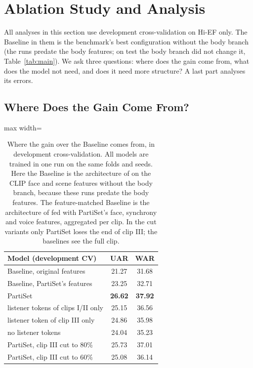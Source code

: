 \documentclass[11pt]{article}
\newcommand{\model}{PartiSet}
\begin{document}
\section{Ablation Study and Analysis}
\label{sec:ablation}

All analyses in this section use development cross-validation on Hi-EF only. The Baseline in them is the benchmark's
best configuration without the body branch (the runs predate the body features; on test the body branch did not change
it, Table~\ref{tab:main}). We ask three questions: where does the gain come from,
what does the model not need, and does it need more structure? A last part analyses its errors.

\subsection{Where Does the Gain Come From?}
\label{sec:origin}

\begin{table}[t]
\centering\small
\begin{adjustbox}{max width=\columnwidth}
\begin{tabular}{lcc}
\toprule
Model (development CV) & UAR & WAR \\
\midrule
Baseline, original features & 21.27 & 31.68 \\
Baseline, \model{}'s features & 23.25 & 32.71 \\
\midrule
\model{} & \textbf{26.62} & \textbf{37.92} \\
\quad listener tokens of clips I/II only & 25.15 & 36.56 \\
\quad listener token of clip III only & 24.86 & 35.98 \\
\quad no listener tokens & 24.04 & 35.23 \\
\midrule
\model{}, clip III cut to 80\% & 25.73 & 37.01 \\
\model{}, clip III cut to 60\% & 25.08 & 36.14 \\
\bottomrule
\end{tabular}
\end{adjustbox}
\caption{Where the gain over the Baseline comes from, in development cross-validation. All models are trained in one run
on the same folds and seeds. Here the Baseline is the architecture of \citet{wang2026hief} on the CLIP face and scene
features without the body branch, because these runs predate the body features. The feature-matched Baseline is the architecture of \citet{wang2026hief} fed with \model{}'s face, synchrony and voice
features, aggregated per clip. In the cut variants only \model{} loses the end of clip III; the baselines see the
full clip.}
\label{tab:origin}
\end{table}
\end{document}
